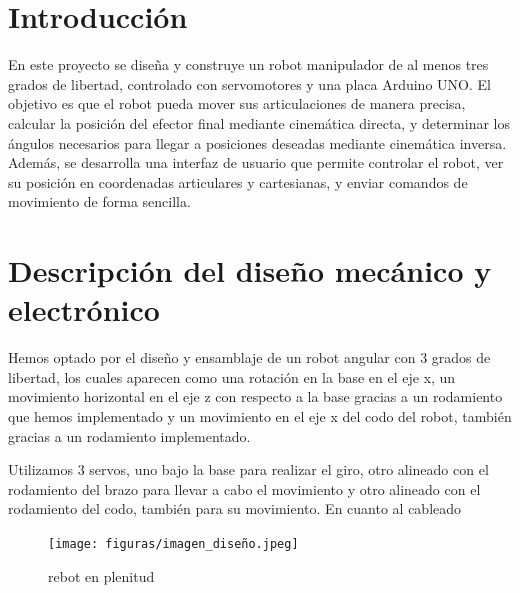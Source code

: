 \documentclass[11pt]{article}
\begin{document}






\section{Introducción}
\label{sec:introduccion}
En este proyecto se diseña y construye un robot manipulador de al menos tres grados de libertad, controlado con servomotores y una placa Arduino UNO. El objetivo es que el robot pueda mover sus articulaciones de manera precisa, calcular la posición del efector final mediante cinemática directa, y determinar los ángulos necesarios para llegar a posiciones deseadas mediante cinemática inversa.
Además, se desarrolla una interfaz de usuario que permite controlar el robot, ver su posición en coordenadas articulares y cartesianas, y enviar comandos de movimiento de forma sencilla.


\section{Descripción del diseño mecánico y electrónico}
\label{sec:diseño}
Hemos optado por el diseño y ensamblaje de un robot angular con 3 grados de libertad, los cuales aparecen como una rotación en la base en el eje x, un movimiento horizontal en el eje z con respecto a la base gracias a un rodamiento que hemos implementado y un movimiento en el eje x del codo del robot, también gracias a un rodamiento implementado.




Utilizamos 3 servos, uno bajo la base para realizar el giro, otro alineado con el rodamiento del brazo para llevar a cabo el movimiento y otro alineado con el rodamiento del codo, también para su movimiento. En cuanto al cableado
\begin{figure}[H]
    \centering
    \texttt{[image: figuras/imagen\_diseño.jpeg]}
    \caption{rebot en plenitud}
\end{figure}
\end{document}
